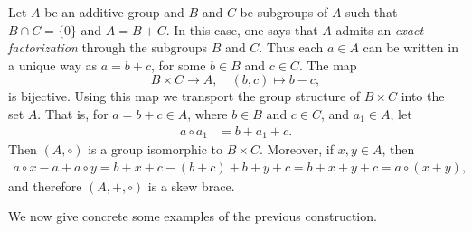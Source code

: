 \begin{example}
    \label{exa:WX}
    Let $A$ be an additive group
	and $B$ and $C$ be subgroups of $A$ such that $B\cap C=\{ 0\}$ and $A=B+C$. In this case, one says that $A$ admits an {\em exact factorization} through the subgroups $B$ and $C$.  Thus each $a\in A$ can be written in a unique
	way as $a=b+c$, for some $b\in B$ and $c\in C$.  The map
	\[
		B\times C\to A,\quad
		(b,c)\mapsto b-c,
	\]
	is bijective. Using this map we transport the group structure of $B\times C$ into the set $A$. That is, for $a=b+c\in A$, where $b\in B$ and $c\in C$, and
	$a_1\in A$, let 
	\begin{align*}
		a\circ a_1&=b+a_1+c.
	\end{align*}
	Then $(A,\circ)$ is a group isomorphic to $B\times C$. Moreover, if $x,y\in A$, 
	then 
	\begin{align*}
	a\circ x-a+a\circ y=b+x+c-(b+c)+b+y+c=b+x+y+c=a\circ (x+y),
	\end{align*}
	and therefore $(A,+,\circ)$ is a skew brace. 
\end{example}


We now give concrete some examples of the previous construction. 

